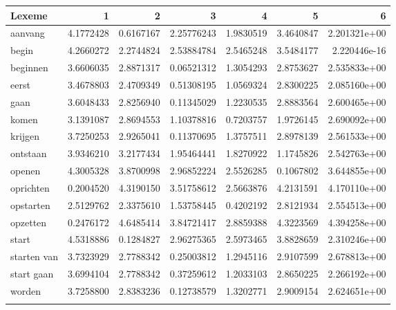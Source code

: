 \begin{tabularx}{\textwidth}{Xrrrrrr}
\lsptoprule
Lexeme        & 1         & 2         & 3          & 4         & 5         & 6            \\ \midrule
aanvang       & 4.1772428 & 0.6167167 & 2.25776243 & 1.9830519 & 3.4640847 & 2.201321e+00 \\
begin         & 4.2660272 & 2.2744824 & 2.53884784 & 2.5465248 & 3.5484177 & 2.220446e-16 \\          
beginnen      & 3.6606035 & 2.8871317 & 0.06521312 & 1.3054293 & 2.8753627 & 2.535833e+00 \\       
eerst         & 3.4678803 & 2.4709349 & 0.51308195 & 1.0569324 & 2.8300225 & 2.085160e+00 \\      
gaan          & 3.6048433 & 2.8256940 & 0.11345029 & 1.2230535 & 2.8883564 & 2.600465e+00 \\
komen         & 3.1391087 & 2.8694553 & 1.10378816 & 0.7203757 & 1.9726145 & 2.690092e+00 \\      
krijgen       & 3.7250253 & 2.9265041 & 0.11370695 & 1.3757511 & 2.8978139 & 2.561533e+00 \\  
ontstaan      & 3.9346210 & 3.2177434 & 1.95464441 & 1.8270922 & 1.1745826 & 2.542763e+00 \\      
openen        & 4.3005328 & 3.8700998 & 2.96852224 & 2.5526285 & 0.1067802 & 3.644855e+00 \\   
oprichten     & 0.2004520 & 4.3190150 & 3.51758612 & 2.5663876 & 4.2131591 & 4.170110e+00 \\
opstarten     & 2.5129762 & 2.3375610 & 1.53758445 & 0.4202192 & 2.8121934 & 2.554513e+00 \\  
opzetten      & 0.2476172 & 4.6485414 & 3.84721417 & 2.8859388 & 4.3223569 & 4.394258e+00 \\       
start         & 4.5318886 & 0.1284827 & 2.96275365 & 2.5973465 & 3.8828659 & 2.310246e+00 \\ 
starten van   & 3.7323929 & 2.7788342 & 0.25003812 & 1.2945116 & 2.9107599 & 2.678813e+00 \\
start gaan    & 3.6994104 & 2.7788342 & 0.37259612 & 1.2033103 & 2.8650225 & 2.266192e+00 \\
worden        & 3.7258800 & 2.8383236 & 0.12738579 & 1.3202771 & 2.9009154 & 2.624651e+00 \\
\lspbottomrule
\end{tabularx}
